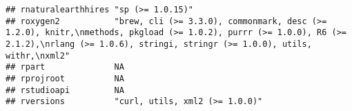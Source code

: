 \documentclass[
]{article}
\begin{document}
\begin{verbatim}
## rnaturalearthhires "sp (>= 1.0.15)"                                                                                                                                                                                                                                                                                                                                                                                                                             
## roxygen2           "brew, cli (>= 3.3.0), commonmark, desc (>= 1.2.0), knitr,\nmethods, pkgload (>= 1.0.2), purrr (>= 1.0.0), R6 (>= 2.1.2),\nrlang (>= 1.0.6), stringi, stringr (>= 1.0.0), utils, withr,\nxml2"                                                                                                                                                                                                                                               
## rpart              NA                                                                                                                                                                                                                                                                                                                                                                                                                                           
## rprojroot          NA                                                                                                                                                                                                                                                                                                                                                                                                                                           
## rstudioapi         NA                                                                                                                                                                                                                                                                                                                                                                                                                                           
## rversions          "curl, utils, xml2 (>= 1.0.0)"                                                                                                                                                                                                                                                                                                                                                                                                               

\end{verbatim}
\end{document}
